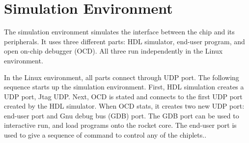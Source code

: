 \documentclass[../main.tex]{subfiles}
\begin{document}
\section{Simulation Environment}
The simulation environment simulates the interface between the chip and its peripherals. It uses three different parts: HDL simulator, end-user program, and open on-chip debugger (OCD).  All three run independently in the Linux environment.

In the Linux environment, all parts connect through UDP port. The following sequence starts up the simulation environment. First, HDL simulation creates a UDP port, Jtag UDP. Next, OCD is stated and connects to the first UDP port created by the HDL simulator. When OCD stats, it creates two new UDP port: end-user port and  Gnu debug bus (GDB) port. The GDB port can be used to interactive run, and load programs onto the rocket core. The end-user port is used to give a sequence of command to control any of the chiplets..
\end{document}
